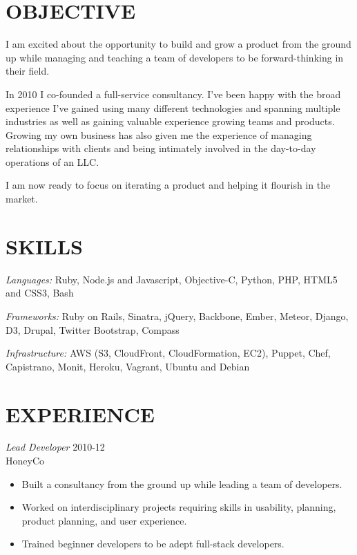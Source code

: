 \documentclass[line,margin]{res}
\begin{document}
\address{q.shanahan@gmail.com}
\address{(641) 233-1123}


\begin{resume}

\section{OBJECTIVE}

    I am excited about the opportunity to build and grow a product from the
    ground up while managing and teaching a team of developers to be forward-thinking
    in their field.

    In 2010 I co-founded a full-service consultancy. I've been happy with the
    broad experience I've gained using many different technologies and
    spanning multiple industries as well as gaining valuable experience
    growing teams and products. Growing my own business has also given me the
    experience of managing relationships with clients and being intimately
    involved in the day-to-day operations of an LLC.

    I am now ready to focus on iterating a product and helping it flourish in
    the market.

\section{SKILLS}
    {\sl Languages:}
        Ruby, Node.js and Javascript,
        Objective-C, Python, PHP, HTML5 and CSS3, Bash

    {\sl Frameworks:}
        Ruby on Rails, Sinatra, jQuery, Backbone, Ember, Meteor,
        Django, D3, Drupal, Twitter Bootstrap, Compass

    {\sl Infrastructure:}
        AWS (S3, CloudFront, CloudFormation, EC2), Puppet,
        Chef, Capistrano, Monit, Heroku, Vagrant, Ubuntu and Debian

\section{EXPERIENCE}
    {\sl Lead Developer}
    \hfill 2010-12 \\
    HoneyCo
    \begin{itemize} \itemsep -2pt
        \item
            Built a consultancy from the ground up while leading
            a team of developers.
        \item
            Worked on interdisciplinary projects requiring skills in
            usability, planning, product planning, and user experience.
        \item
            Trained beginner developers to be adept full-stack developers.
    \end{itemize}


\end{resume}
\end{document}
